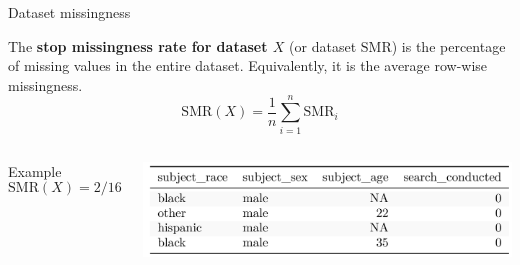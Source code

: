 \documentclass[11pt]{beamer}
\newcommand{\indic}{\mathbbm{1}_M}
\newcommand{\SMR}{\mathrm{SMR}}
\begin{document}

\begin{frame}{Dataset missingness}
    \begin{definition}
    The {\bf{stop missingness rate for dataset $X$}} (or dataset $\SMR$) is the percentage of missing values in the entire dataset. Equivalently, it is the average row-wise missingness. 
    \begin{equation*}
    \SMR(X) = \dfrac{1}{n} \sum_{i = 1}^{n} \SMR_i
    \end{equation*}
    \end{definition} \pause
    \begin{columns}
        Example
            \begin{equation*}
    	    \SMR(X) = 2/16
	    \end{equation*}
	    \begin{center}
	    \includegraphics[scale = 0.6]{fig/toyoak.png}
	    \end{center}
    \end{columns}
\end{frame}
\end{document}
